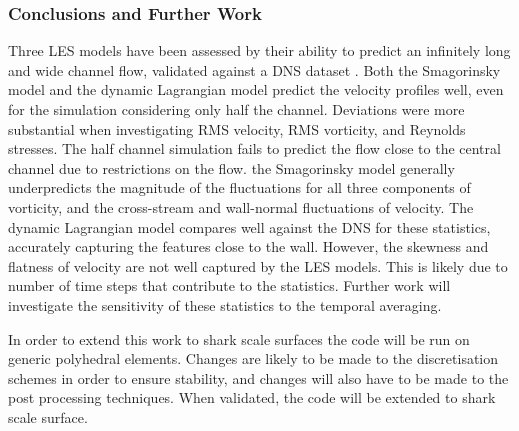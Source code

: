 \documentclass[12pt,oneside,a4paper]{article}
\begin{document}
\subsubsection{Conclusions and Further Work}
Three LES models have been assessed by their ability to predict an infinitely long and wide channel flow, validated against a DNS dataset \citep{vreman2014}. Both the Smagorinsky model \citep{smagorinsky1963} and the dynamic Lagrangian model \citep{meneveau1996} predict the velocity profiles well, even for the simulation considering only half the channel. Deviations were more substantial when investigating RMS velocity, RMS vorticity, and Reynolds stresses. The half channel simulation fails to predict the flow close to the central channel due to restrictions on the flow. the Smagorinsky model generally underpredicts the magnitude of the fluctuations for all three components of vorticity, and the cross-stream and wall-normal fluctuations of velocity. The dynamic Lagrangian model compares well against the DNS for these statistics, accurately capturing the features close to the wall. However, the skewness and flatness of velocity are not well captured by the LES models. This is likely due to number of time steps that contribute to the statistics. Further work will investigate the sensitivity of these statistics to the temporal averaging.

In order to extend this work to shark scale surfaces the code will be run on generic polyhedral elements. Changes are likely to be made to the discretisation schemes in order to ensure stability, and changes will also have to be made to the post processing techniques. When validated, the code will be extended to shark scale surface. 

\newpage
\end{document}
